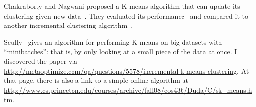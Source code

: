 \documentclass{article}
\begin{document}
Chakraborty and Nagwani proposed a K-means algorithm that can update its clustering given new data~\cite{chakraborty2011analysis}.  They evaluated its performance~\cite{chakraborty2011kmeans} and compared it to another incremental clustering algorithm~\cite{chakraborty2011performance}.

Scully~\cite{sculley2010web} gives an algorithm for performing K-means on big datasets with ``minibatches'': that is, by only looking at a small piece of the data at once.  I discovered the paper via \url{http://metaoptimize.com/qa/questions/5578/incremental-k-means-clustering}.  At that page, there is also a link to a simple online algorithm at \url{http://www.cs.princeton.edu/courses/archive/fall08/cos436/Duda/C/sk_means.htm}.



\end{document}
